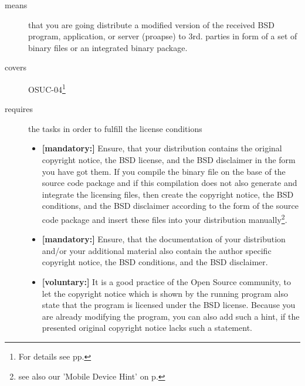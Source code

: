 \begin{description}
\item[means] that you are going distribute a modified version of the received
BSD pro\-gram, application, or server (proapse) to 3rd. parties in form of a set
of binary files or an integrated binary package.
\item[covers] OSUC-04\footnote{For details see pp. \pageref{OSUC-04-DEF}}
\item[requires] the tasks in order to fulfill the license conditions
\begin{itemize}

  \item  \textbf{[mandatory:]} Ensure, that your distribution contains the
  original copyright notice, the BSD license, and the BSD disclaimer in the form
  you have got them. If you compile the binary file on the base of the source
  code package and if this compilation does not also generate and integrate the
  licensing files, then create the copyright notice, the BSD conditions, and the
  BSD disclaimer according to the form of the source code package and insert
  these files into your distribution manually\footnote{see also our 'Mobile
  Device Hint' on p. \pageref{MobileDeviceHint}}.

  \item  \textbf{[mandatory:]} Ensure, that the documentation of your
  distribution and/or your additional material also contain the author specific
  copyright notice, the BSD conditions, and the BSD disclaimer.
  
  \item \textbf{[voluntary:]} It is a good practice of the Open Source
  community, to let the copyright notice which is shown by the running program
  also state that the program is licensed under the BSD license. Because you are
  already modifying the program, you can also add such a hint, if the presented
  original copyright notice lacks such a statement.
\end{itemize}
\end{description}

